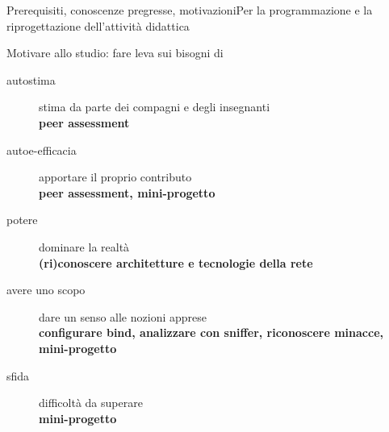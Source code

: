 \documentclass[italian]{beamer}
\begin{document}
\begin{frame}[allowframebreaks]{Prerequisiti, conoscenze pregresse, motivazioni}{Per la programmazione e la riprogettazione dell'attivit\`a didattica}
		
	\begin{block}{Motivare allo studio: fare leva sui bisogni di}
		\begin{description}
			\item[autostima] stima da parte dei compagni e degli insegnanti\\\hfill\textbf{peer assessment}
			\item[autoe-efficacia] apportare il proprio contributo\\\hfill\textbf{peer assessment, mini-progetto}
			\item[potere] dominare la realt\`a\\\hfill\textbf{(ri)conoscere architetture e tecnologie della rete}
			\item[avere uno scopo] dare un senso alle nozioni apprese\\\hfill\textbf{configurare bind, analizzare con sniffer, riconoscere minacce, mini-progetto}
			\item[sfida] difficolt\`a da superare\\\hfill\textbf{mini-progetto}
		\end{description}
	\end{block}
\end{frame}
\end{document}
